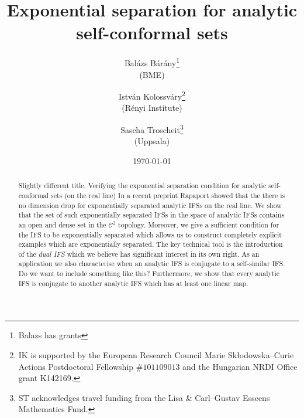 \documentclass[12pt,]{article}
\title{Exponential separation for analytic self-conformal sets %
}
\author{Bal\'azs B\'ar\'any\footnote{Balazs has grants}\\(BME) \and Istv\'an
  Kolossv\'ary\footnote{IK is supported by the European Research Council Marie Sk\l odowska--Curie Actions Postdoctoral Fellowship $\#101109013$ and the Hungarian NRDI Office grant K142169.}\\ (R\'enyi Institute) \and Sascha
Troscheit\footnote{ST acknowledges travel funding from the Lisa \& Carl--Gustav Esseens Mathematics
Fund.} \\(Uppsala)}
\date{\today}
\theoremstyle{definition}
\theoremstyle{remark}
\newcommand{\0}{\mathbf{0}}
\begin{document}
\frenchspacing
\maketitle

\begin{abstract}
{\color{blue} Slightly different title, Verifying the exponential separation condition for analytic self-conformal sets (on the real line)}
In a recent preprint Rapaport showed that the there is no dimension drop for
exponentially separated analytic IFSs on the real line. We show that the set of such exponentially
separated IFSs in the space of analytic IFSs contains an open and dense set in the $\mathcal{C}^2$
topology. Moreover, we give a sufficient condition for the IFS to be exponentially separated which
allows us to construct completely explicit examples which are exponentially separated. The key
technical tool is the introduction of the \emph{dual IFS} which we believe has significant interest
in its own right. As an application we also characterise when an analytic IFS is conjugate to a
self-similar IFS. {\color{red}Do we want to include something like this? Furthermore, we show that every analytic IFS is conjugate to another analytic IFS which has at least one linear map.}
\end{abstract}
\end{document}
